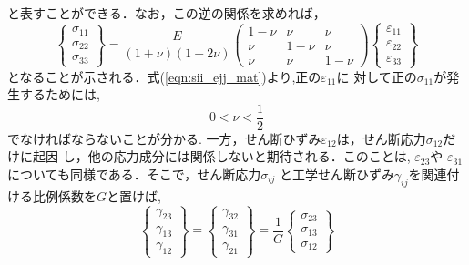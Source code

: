 \documentclass[10pt,a4j]{jarticle}
\begin{document}
と表すことができる．なお，この逆の関係を求めれば，
\begin{equation}
	\left\{ 
	\begin{array}{*{20}{c}}
		\sigma _{11}\\
		\sigma _{22}\\
		\sigma _{33}
	\end{array} 
	\right\} 
	= 
	\frac{E}{\left( 1 + \nu  \right)\left( 1 - 2\nu  \right)}
	\left( 
		\begin{array}{*{20}{c}}
		1 - \nu & \nu &\nu \\
		\nu & 1 - \nu &\nu \\
		\nu &\nu &1 - \nu 
		\end{array}
	\right)
	\left\{ 
		\begin{array}{*{20}{c}}
		\varepsilon _{11}\\
		\varepsilon _{22}\\
		\varepsilon _{33}
		\end{array}
	\right\}
	\label{eqn:sii_ejj_mat}
\end{equation}
となることが示される．式(\ref{eqn:sii_ejj_mat})より,正の$\varepsilon_{11}$に
対して正の$\sigma_{11}$が発生するためには,
\begin{equation}
	0< \nu < \frac{1}{2} 
\end{equation}
でなければならないことが分かる.
一方，せん断ひずみ$\varepsilon_{12}$は，せん断応力$\sigma_{12}$だけに起因
し，他の応力成分には関係しないと期待される．このことは, $\varepsilon_{23}$や
$\varepsilon_{31}$についても同様である．そこで，せん断応力$\sigma_{ij}$
と工学せん断ひずみ$\gamma_{ij}$を関連付ける比例係数を$G$と置けば,
\begin{equation}
	\left\{ 
		\begin{array}{*{20}{c}}
		\gamma_{23}\\
		\gamma_{13}\\
		\gamma_{12}
		\end{array}
	\right\} 
	=
	\left\{ 
		\begin{array}{*{20}{c}}
		\gamma_{32}\\
		\gamma_{31}\\
		\gamma_{21}
		\end{array}
	\right\} 
	= \frac{1}{G}
	\left\{
		\begin{array}{*{20}{c}}
		\sigma _{23}\\
		\sigma _{13}\\
		\sigma _{12}
		\end{array}
	\right\}
	\label{eqn:gij_sij}
\end{equation}
\end{document}
